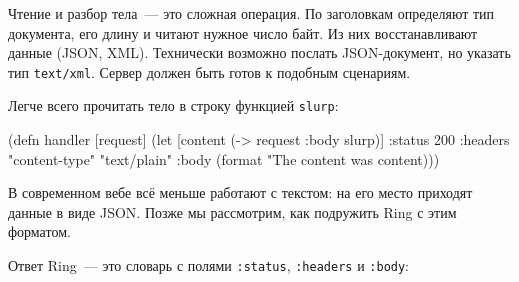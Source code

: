 
Чтение и разбор тела~--- это сложная операция. По заголовкам определяют тип
документа, его длину и читают нужное число байт. Из них восстанавливают данные
(JSON, XML). Технически возможно послать JSON-документ, но указать тип
\verb|text/xml|. Сервер должен быть готов к подобным сценариям.

Легче всего прочитать тело в строку функцией \verb|slurp|:

\ifx\devicetype\mobile

\begin{english}
  \begin{clojure}
(defn handler [request]
 (let [content (-> request :body slurp)]
  {:status 200
   :headers {"content-type" "text/plain"}
   :body (format "The content was %
                 content)}))
  \end{clojure}
\end{english}

\else

\begin{english}
\end{english}

\fi

В современном вебе всё меньше работают с текстом: на его место приходят данные в
виде JSON. Позже мы рассмотрим, как подружить Ring с этим форматом.


Ответ Ring~--- это словарь с полями \verb|:status|, \verb|:headers| и
\verb|:body|:

